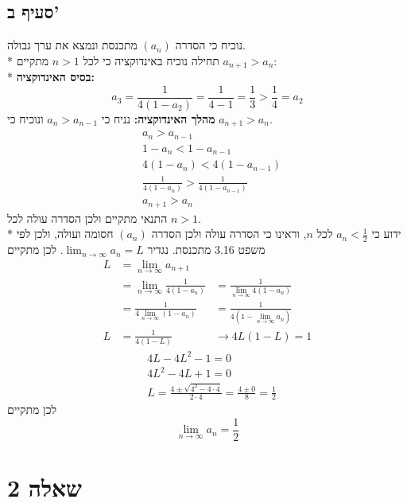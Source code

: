 \subsection{סעיף ב'}
נוכיח כי הסדרה $(a_n)$ מתכנסת ונמצא את ערך גבולה. \\*
תחילה נוכיח באינדוקציה כי לכל $n > 1$ מתקיים $a_{n + 1} > a_n$: \\*
\textbf{בסיס האינדוקציה:}
\[
	a_3 = \frac{1}{4(1 - a_2)} = \frac{1}{4 - 1} = \frac{1}{3} > \frac{1}{4} = a_2
\]
\textbf{מהלך האינדוקציה:}
נניח כי $a_n > a_{n - 1}$ ונוכיח כי $a_{n + 1} > a_n$.
\begin{align*}
	& a_n > a_{n - 1} \\
	& 1 - a_n < 1 - a_{n - 1} \\
	& 4(1 - a_n) < 4(1 - a_{n - 1}) \\
	& \frac{1}{4(1 - a_n)} > \frac{1}{4(1 - a_{n - 1})} \\
	& a_{n + 1} > a_n
\end{align*}
התנאי מתקיים ולכן הסדרה עולה לכל $n > 1$. \\*
ידוע כי $a_n < \frac{1}{2}$ לכל $n$, וראינו כי הסדרה עולה ולכן הסדרה $(a_n)$ חסומה ועולה, ולכן לפי משפט 3.16 מתכנסת.
נגדיר $\lim_{n \to \infty} a_n = L$. לכן מתקיים
\begin{align*}
	L & = \lim_{n \to \infty} a_{n + 1} \\
	  & = \lim_{n \to \infty} \frac{1}{4(1 - a_n)}
	  & = \frac{1}{\displaystyle\lim_{n \to \infty} 4(1 - a_n)} \\
	  & = \frac{1}{4 \displaystyle\lim_{n \to \infty} (1 - a_n)}
	  & = \frac{1}{4 (1 - \displaystyle\lim_{n \to \infty} a_n)} \\
	L & = \frac{1}{4 (1 - L)}
	  & \rightarrow 4L(1 - L) = 1
\end{align*}
\begin{align*}
	& 4L - 4L^2 - 1 = 0 \\
	& 4L^2 - 4L + 1 = 0 \\
	& L = \frac{4 \pm \sqrt{4^2 - 4 \cdot 4}}{2 \cdot 4} = \frac{4 \pm 0}{8} = \frac{1}{2}
\end{align*}
לכן מתקיים
\[
	\lim_{n \to \infty} a_n = \frac{1}{2}
\]

\section{שאלה 2}
